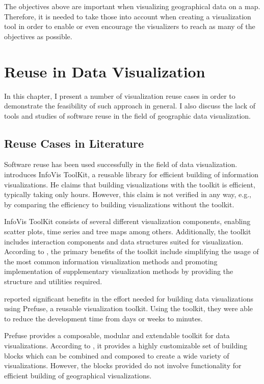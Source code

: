 The objectives above are important when visualizing geographical data on a map. Therefore, it is needed to take those into account when creating a visualization tool in order to enable or even encourage the visualizers to reach as many of the objectives as possible.

\chapter{Reuse in Data Visualization}
\label{chapter:reuseinvisualization}

In this chapter, I present a number of visualization reuse cases in order to demonstrate the feasibility of such approach in general. I also discuss the lack of tools and studies of software reuse in the field of geographic data visualization.

\section{Reuse Cases in Literature}

Software reuse has been used successfully in the field of data visualization. \citet{fekete_infovis_2004} introduces InfoVis ToolKit, a reusable library for efficient building of information visualizations. He claims that building visualizations with the toolkit is efficient, typically taking only hours. However, this claim is not verified in any way, e.g., by comparing the efficiency to building visualizations without the toolkit.

InfoVis ToolKit consists of several different visualization components, enabling scatter plots, time series and tree maps among others. Additionally, the toolkit includes interaction components and data structures suited for visualization. According to \citeauthor{fekete_infovis_2004}, the primary benefits of the toolkit include simplifying the usage of the most common information visualization methods and promoting implementation of supplementary visualization methods by providing the structure and utilities required.

\citet{heer_prefuse:_2005} reported significant benefits in the effort needed for building data visualizations using Prefuse, a reusable visualization toolkit. Using the toolkit, they were able to reduce the development time from days or weeks to minutes.

Prefuse provides a composable, modular and extendable toolkit for data visualizations. According to \citet{heer_prefuse:_2005}, it provides a highly customizable set of building blocks which can be combined and composed to create a wide variety of visualizations. However, the blocks provided do not involve functionality for efficient building of geographical visualizations.

